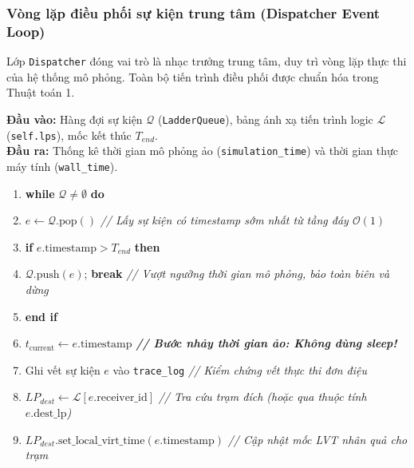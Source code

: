 \newpage
\subsubsection{Vòng lặp điều phối sự kiện trung tâm (Dispatcher Event Loop)}
\label{subsubsec:dispatcher-engine}

\hspace{0.5cm}Lớp \texttt{Dispatcher} đóng vai trò là nhạc trưởng trung tâm, duy trì vòng lặp thực thi của hệ thống mô phỏng. Toàn bộ tiến trình điều phối được chuẩn hóa trong Thuật toán 1.

\begin{tcolorbox}[colback=white, colframe=bkblue, halign title=flush left, title={\raggedright \textbf{Thuật toán 1: Vòng lặp điều phối sự kiện rời rạc (\texttt{SequentialEventDispatcher.run})}}, fonttitle=\bfseries]
\textbf{Đầu vào:} Hàng đợi sự kiện $\mathcal{Q}$ (\texttt{LadderQueue}), bảng ánh xạ tiến trình logic $\mathcal{L}$ (\texttt{self.lps}), mốc kết thúc $T_{end}$.\\
\textbf{Đầu ra:} Thống kê thời gian mô phỏng ảo (\texttt{simulation\_time}) và thời gian thực máy tính (\texttt{wall\_time}).
\begin{enumerate}[leftmargin=2em, label=\arabic*:, itemsep=2pt, topsep=4pt]
\item \textbf{while} $\mathcal{Q} \neq \emptyset$ \textbf{do}
\item \quad $e \leftarrow \mathcal{Q}.\text{pop}()$ \hfill \textit{\color{gray}// Lấy sự kiện có timestamp sớm nhất từ tầng đáy $\mathcal{O}(1)$}
\item \quad \textbf{if} $e.\text{timestamp} > T_{end}$ \textbf{then}
\item \quad\quad $\mathcal{Q}.\text{push}(e)$; \textbf{break} \hfill \textit{\color{gray}// Vượt ngưỡng thời gian mô phỏng, bảo toàn biên và dừng}
\item \quad \textbf{end if}
\item \quad $t_{\text{current}} \leftarrow e.\text{timestamp}$ \hfill \textit{\color{red!70!black}\textbf{// Bước nhảy thời gian ảo: Không dùng sleep!}}
\item \quad Ghi vết sự kiện $e$ vào \texttt{trace\_log} \hfill \textit{\color{gray}// Kiểm chứng vết thực thi đơn điệu}
\item \quad $LP_{dest} \leftarrow \mathcal{L}[e.\text{receiver\_id}]$ \hfill \textit{\color{gray}// Tra cứu trạm đích (hoặc qua thuộc tính $e.\text{dest\_lp}$)}
\item \quad $LP_{dest}.\text{set\_local\_virt\_time}(e.\text{timestamp})$ \hfill \textit{\color{gray}// Cập nhật mốc LVT nhân quả cho trạm}

\end{enumerate}
\end{tcolorbox}
